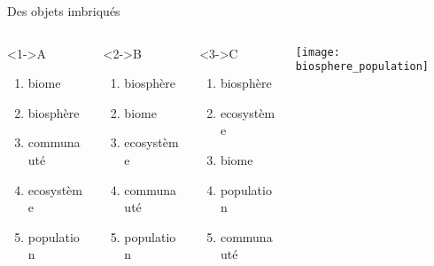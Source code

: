 \documentclass[10pt]{beamer}
\begin{document}
\begin{frame}{Des objets imbriqués} 
  \begin{columns}
    \begin{column}[c]{0.25\textwidth}
      \begin{small}
        \begin{block}<1->{A}
          \begin{enumerate}
          \item biome
          \item biosphère
          \item communauté
          \item ecosystème
          \item population
          \end{enumerate}
        \end{block}
      \end{small}
    \end{column}
    \begin{column}[c]{0.25\textwidth}
      \begin{small}
        \begin{block}<2->{B}
          \begin{enumerate}
          \item biosphère
          \item biome
          \item ecosystème
          \item communauté
          \item population
          \end{enumerate}
        \end{block}
      \end{small}
    \end{column}
    \begin{column}[c]{0.25\textwidth}
      \begin{small}
        \begin{block}<3->{C}
          \begin{enumerate}
          \item biosphère
          \item ecosystème
          \item biome
          \item population
          \item communauté
          \end{enumerate}
        \end{block}
      \end{small}
    \end{column}
    \begin{column}[c]{0.25\textwidth}
      \begin{center}
        \texttt{[image: biosphere\_population]}
      \end{center}
    \end{column}
  \end{columns}
\end{frame}
\end{document}
